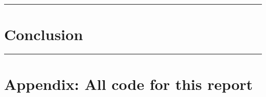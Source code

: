 \documentclass[
]{article}
\begin{document}
\begin{center}\rule{0.5\linewidth}{0.5pt}\end{center}

\newpage

\hypertarget{conclusion}{%
\section{Conclusion}\label{conclusion}}

\begin{center}\rule{0.5\linewidth}{0.5pt}\end{center}

\newpage

\hypertarget{appendix-all-code-for-this-report}{%
\section{Appendix: All code for this
report}\label{appendix-all-code-for-this-report}}
\end{document}
